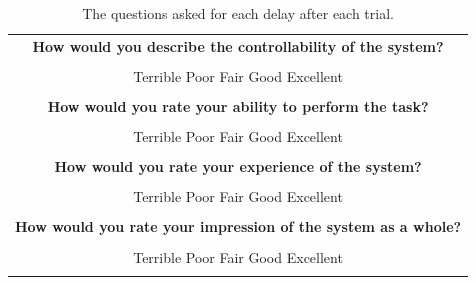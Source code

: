 \documentclass[nofilelist]{cslthse-msc}
\begin{document}
\begin{table}[!hbt]
   \centering
   \begin{tabular}{|c|}
      \hline
      \textbf{How would you describe the controllability of the system?} \\
      \\
      Terrible \hspace{10pt} Poor \hspace{10pt} Fair \hspace{10pt} Good \hspace{10pt} Excellent \\    
      \\
      \hline
      \textbf{How would you rate your ability to perform the task?} \\
      \\
      Terrible \hspace{10pt} Poor \hspace{10pt} Fair \hspace{10pt} Good \hspace{10pt} Excellent \\    
      \\
      \hline
      \textbf{How would you rate your experience of the system?} \\
      \\
      Terrible \hspace{10pt} Poor \hspace{10pt} Fair \hspace{10pt} Good \hspace{10pt} Excellent \\    
      \\
      \hline
      \textbf{How would you rate your impression of the system as a whole?} \\
      \\
      Terrible \hspace{10pt} Poor \hspace{10pt} Fair \hspace{10pt} Good \hspace{10pt} Excellent \\    
      \\
      \hline
   \end{tabular}
   \caption{The questions asked for each delay after each trial.}
   \label{tab:form-questions}
\end{table}

\vspace{10pt}
\end{document}
